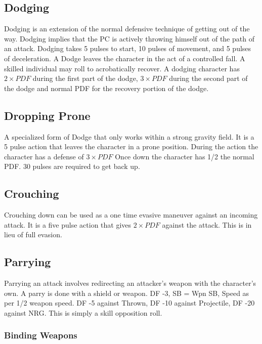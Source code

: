 \subsection{Dodging}

Dodging is an extension of the normal defensive technique of getting out
of the way. Dodging implies that the PC is actively throwing himself out
of the path of an attack. Dodging takes 5 pulses to start, 10 pulses of movement,
and 5 pulses of deceleration. A Dodge leaves the character in the act of
a controlled fall. A skilled individual may roll to acrobatically recover.
A dodging character has \( 2 \times PDF \) during the first part of the dodge,
\( 3 \times PDF \) during the second part of the dodge and normal PDF for
the recovery portion of the dodge.

\subsection{Dropping Prone}

A specialized form of Dodge that only works within a strong gravity
field. It is a 5 pulse action that leaves the character in a prone
position. During the action the character has a defense of \( 3 \times PDF \)
Once down the character has 1/2 the normal PDF. 30 pulses are required to
get back up.

\subsection{Crouching}

Crouching down can be used as a one time evasive maneuver against an
incoming attack. It is a five pulse action that gives \( 2 \times PDF \)
against the attack. This is in lieu of full evasion.

\subsection{Parrying}

Parrying an attack involves redirecting an attacker's weapon with the
character's own. A parry is done with a shield or weapon. DF -3, SB = Wpn SB,
Speed as per 1/2 weapon speed. DF -5 against Thrown, DF -10 against Projectile,
DF -20 against NRG. This is simply a skill opposition roll.

\subsubsection{Binding Weapons}

